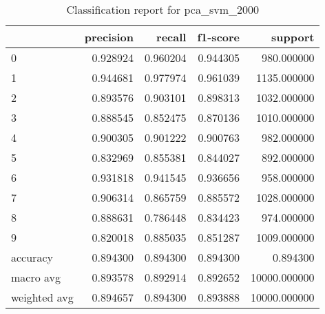 \begin{table}[htb!]
\centering
\caption{Classification report for pca_svm_2000}
\label{tab:classification-report-pca_svm_2000}
\begin{tabular}{lrrrr}
\toprule
 & precision & recall & f1-score & support \\
\midrule
0 & 0.928924 & 0.960204 & 0.944305 & 980.000000 \\
1 & 0.944681 & 0.977974 & 0.961039 & 1135.000000 \\
2 & 0.893576 & 0.903101 & 0.898313 & 1032.000000 \\
3 & 0.888545 & 0.852475 & 0.870136 & 1010.000000 \\
4 & 0.900305 & 0.901222 & 0.900763 & 982.000000 \\
5 & 0.832969 & 0.855381 & 0.844027 & 892.000000 \\
6 & 0.931818 & 0.941545 & 0.936656 & 958.000000 \\
7 & 0.906314 & 0.865759 & 0.885572 & 1028.000000 \\
8 & 0.888631 & 0.786448 & 0.834423 & 974.000000 \\
9 & 0.820018 & 0.885035 & 0.851287 & 1009.000000 \\
accuracy & 0.894300 & 0.894300 & 0.894300 & 0.894300 \\
macro avg & 0.893578 & 0.892914 & 0.892652 & 10000.000000 \\
weighted avg & 0.894657 & 0.894300 & 0.893888 & 10000.000000 \\
\bottomrule
\end{tabular}
\end{table}
